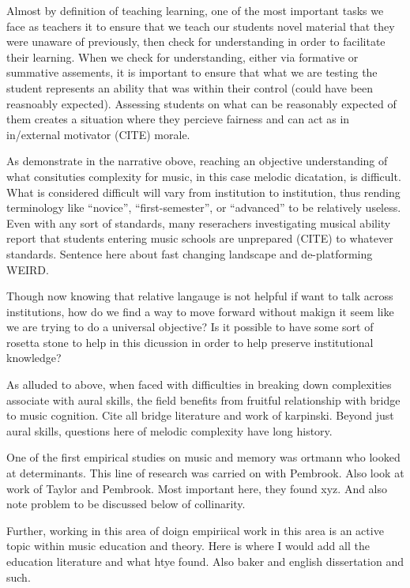 \documentclass[english,man,floatsintext]{apa6}
\begin{document}
Almost by definition of teaching learning, one of the most important tasks we face as teachers it to ensure that we teach our students novel material that they were unaware of previously, then check for understanding in order to facilitate their learning.
When we check for understanding, either via formative or summative assements, it is important to ensure that what we are testing the student represents an ability that was within their control (could have been reasnoably expected).
Assessing students on what can be reasonably expected of them creates a situation where they percieve fairness and can act as in in/external motivator (CITE) morale.

As demonstrate in the narrative obove, reaching an objective understanding of what consituties complexity for music, in this case melodic dicatation, is difficult.
What is considered difficult will vary from institution to institution, thus rending terminology like \enquote{novice}, \enquote{first-semester}, or \enquote{advanced} to be relatively useless.
Even with any sort of standards, many reserachers investigating musical ability report that students entering music schools are unprepared (CITE) to whatever standards.
Sentence here about fast changing landscape and de-platforming WEIRD.

Though now knowing that relative langauge is not helpful if want to talk across institutions, how do we find a way to move forward without makign it seem like we are trying to do a universal objective?
Is it possible to have some sort of rosetta stone to help in this dicussion in order to help preserve institutional knowledge?

As alluded to above, when faced with difficulties in breaking down complexities associate with aural skills, the field benefits from fruitful relationship with bridge to music cognition.
Cite all bridge literature and work of karpinski.
Beyond just aural skills, questions here of melodic complexity have long history.

One of the first empirical studies on music and memory was ortmann who looked at determinants.
This line of research was carried on with Pembrook.
Also look at work of Taylor and Pembrook.
Most important here, they found xyz.
And also note problem to be discussed below of collinarity.

Further, working in this area of doign empiriical work in this area is an active topic within music education and theory.
Here is where I would add all the education literature and what htye found.
Also baker and english dissertation and such.
\end{document}
